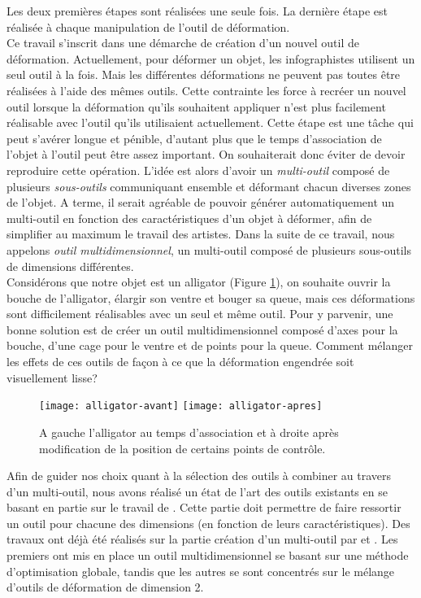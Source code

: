 Les deux premières étapes sont réalisées une seule fois. La dernière étape est
réalisée à chaque manipulation de l'outil de déformation. \\

Ce travail s'inscrit dans une démarche de création d'un nouvel outil de
déformation. Actuellement, pour déformer un objet, les infographistes
utilisent un seul outil à la fois. Mais les différentes déformations ne
peuvent pas toutes être réalisées à l'aide des mêmes outils. Cette contrainte
les force à recréer un nouvel outil lorsque la déformation qu'ils souhaitent
appliquer n'est plus facilement réalisable avec l'outil qu'ils utilisaient
actuellement. Cette étape est une tâche qui peut s'avérer longue et pénible,
d'autant plus que le temps d'association de l'objet à l'outil peut être assez
important. On souhaiterait donc éviter de devoir reproduire cette opération.
L'idée est alors d'avoir un \textit {multi-outil} composé de plusieurs \textit
{sous-outils} communiquant ensemble et déformant chacun diverses zones de
l'objet. A terme, il serait agréable de pouvoir générer automatiquement un
multi-outil en fonction des caractéristiques d'un objet à déformer, afin de
simplifier au maximum le travail des artistes. Dans la suite de ce travail,
nous appelons \textit{outil multidimensionnel}, un multi-outil composé de
plusieurs sous-outils de dimensions différentes. \\

Considérons que notre objet est un alligator (Figure \ref{INTall}), on
souhaite ouvrir la bouche de l'alligator, élargir son ventre et bouger sa
queue, mais ces déformations sont difficilement réalisables avec un seul et
même outil. Pour y parvenir, une bonne solution est de créer un outil
multidimensionnel composé d'axes pour la bouche, d'une cage pour le ventre et
de points pour la queue. Comment mélanger les effets de ces outils de
façon à ce que la déformation engendrée soit visuellement lisse? \\

\begin{figure}[ht]
  \texttt{[image: alligator-avant]}
  \texttt{[image: alligator-apres]}

  \caption[Explication déformation multi-outil]   {A gauche l'alligator au
temps d'association et à droite après modification de la position de certains
points de contrôle.}

  \label{INTall}
\end{figure}

Afin de guider nos choix quant à la sélection des outils à combiner au travers
d'un multi-outil, nous avons réalisé un état de l'art des outils existants en
se basant en partie sur le travail de \cite{GB08}. Cette partie doit permettre
de faire ressortir un outil pour chacune des dimensions (en fonction de leurs
caractéristiques). Des travaux ont déjà été réalisés sur la partie création
d'un multi-outil par \cite{JBPS11} et \cite{GPCP13}. Les premiers ont mis en
place un outil multidimensionnel se basant sur une méthode d'optimisation
globale, tandis que les autres se sont concentrés sur le mélange d'outils de
déformation de dimension 2. 

